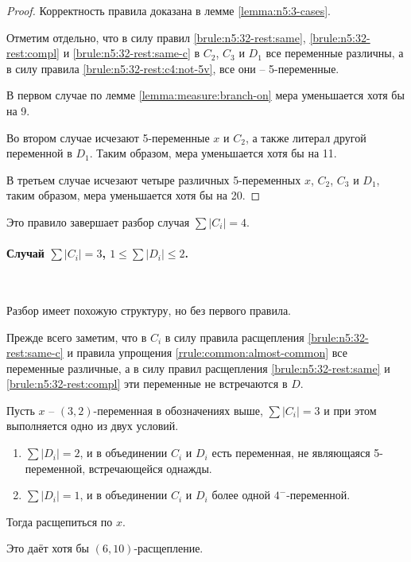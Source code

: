 \begin{proof}
 Корректность правила доказана в лемме \ref{lemma:n5:3-cases}.

 Отметим отдельно, что в силу правил \ref{brule:n5:32-rest:same}, \ref{brule:n5:32-rest:compl} и \ref{brule:n5:32-rest:same-c} в $C_2$, $C_3$ и $D_1$ все переменные различны, а в силу правила \ref{brule:n5:32-rest:c4:not-5v}, все они -- 5-переменные.

 В первом случае по лемме \ref{lemma:measure:branch-on} мера уменьшается хотя бы на 9.

 Во втором случае исчезают 5-переменные $x$ и $C_2$, а также литерал другой переменной в $D_1$. Таким образом, мера уменьшается хотя бы на 11.

 В третьем случае исчезают четыре различных 5-переменных $x$, $C_2$, $C_3$ и $D_1$, таким образом, мера уменьшается хотя бы на 20.
\end{proof}

Это правило завершает разбор случая $\sum |C_i| = 4$.

\paragraph{Случай $\sum |C_i| = 3$, $1 \leq \sum |D_i| \leq 2$.} ~

Разбор имеет похожую структуру, но без первого правила.

Прежде всего заметим, что в $C_i$ в силу правила расщепления \ref{brule:n5:32-rest:same-c} и правила упрощения \ref{rrule:common:almost-common} все переменные различные, а в силу правил расщепления \ref{brule:n5:32-rest:same} и \ref{brule:n5:32-rest:compl} эти переменные не встречаются в $D$.

\begin{brule}
 Пусть $x$ -- $(3,2)$-переменная в обозначениях выше, $\sum |C_i| = 3$ и при этом выполняется одно из двух условий.

 \begin{enumerate}
  \item $\sum |D_i| = 2$, и в объединении $C_i$ и $D_i$ есть переменная, не являющаяся 5-переменной, встречающейся однажды.
  \item $\sum |D_i| = 1$, и в объединении $C_i$ и $D_i$ более одной $4^-$-переменной.
 \end{enumerate}

 Тогда расщепиться по $x$.

 Это даёт хотя бы $(6,10)$-расщепление.
 \label{brule:n5:32-rest:c3:not-5v}
\end{brule}

